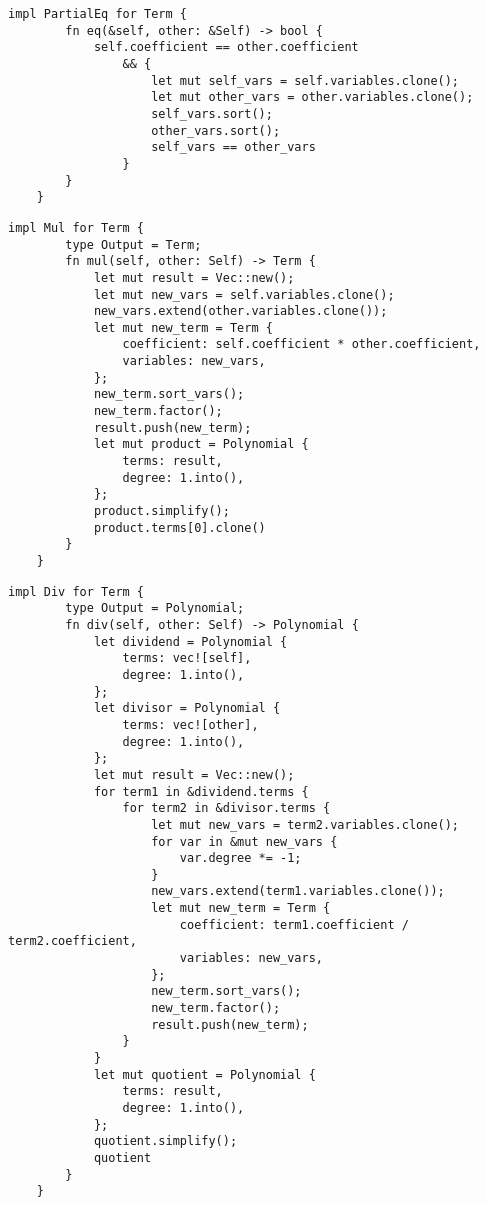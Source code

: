 \begin{lstlisting}[caption={The implementation of \texttt{PartialEq} for the \texttt{Term} struct}, label={lst:term-eq}]
    impl PartialEq for Term {
        fn eq(&self, other: &Self) -> bool {
            self.coefficient == other.coefficient
                && {
                    let mut self_vars = self.variables.clone();
                    let mut other_vars = other.variables.clone();
                    self_vars.sort();
                    other_vars.sort();
                    self_vars == other_vars
                }
        }
    }
\end{lstlisting}

\begin{lstlisting}[caption={The implementation of the multiplication operation for the \texttt{Term} struct}, label={lst:term-mul}]
    impl Mul for Term {
        type Output = Term;
        fn mul(self, other: Self) -> Term {
            let mut result = Vec::new();
            let mut new_vars = self.variables.clone();
            new_vars.extend(other.variables.clone());
            let mut new_term = Term {
                coefficient: self.coefficient * other.coefficient,
                variables: new_vars,
            };
            new_term.sort_vars();
            new_term.factor();
            result.push(new_term);
            let mut product = Polynomial {
                terms: result,
                degree: 1.into(),
            };
            product.simplify();
            product.terms[0].clone()
        }
    }
\end{lstlisting}

\begin{lstlisting}[caption={The implementation of the division operation for the \texttt{Term} struct}, label={lst:term-div}]
    impl Div for Term {
        type Output = Polynomial;
        fn div(self, other: Self) -> Polynomial {
            let dividend = Polynomial {
                terms: vec![self],
                degree: 1.into(),
            };
            let divisor = Polynomial {
                terms: vec![other],
                degree: 1.into(),
            };
            let mut result = Vec::new();
            for term1 in &dividend.terms {
                for term2 in &divisor.terms {
                    let mut new_vars = term2.variables.clone();
                    for var in &mut new_vars {
                        var.degree *= -1;
                    }
                    new_vars.extend(term1.variables.clone());
                    let mut new_term = Term {
                        coefficient: term1.coefficient / term2.coefficient,
                        variables: new_vars,
                    };
                    new_term.sort_vars();
                    new_term.factor();
                    result.push(new_term);
                }
            }
            let mut quotient = Polynomial {
                terms: result,
                degree: 1.into(),
            };
            quotient.simplify();
            quotient
        }
    }
\end{lstlisting}


